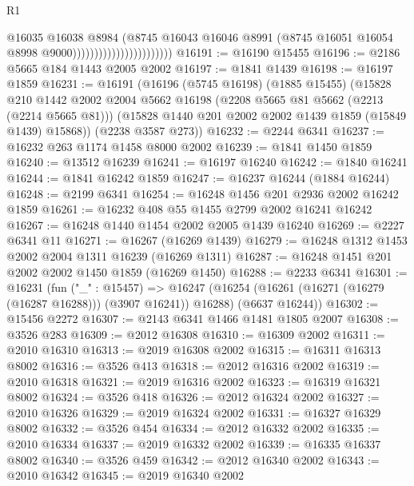 \begin{lexlean}{R1}
\begin{coremodule}
                                              @16035
                                              @16038
                                              @8984
                                              (@8745
                                                @16043
                                                @16046
                                                @8991
                                                (@8745
                                                  @16051
                                                  @16054
                                                  @8998
                                                  @9000)))))))))))))))))))))))
@16191 := @16190 @15455
@16196 := @2186 @5665 @184 @1443 @2005 @2002
@16197 := @1841 @1439
@16198 := @16197 @1859
@16231 := @16191
    (@16196
      (@5745 @16198)
      (@1885 @15455)
      (@15828
        @210
        @1442
        @2002
        @2004
        @5662
        @16198
        (@2208 @5665 @81 @5662 (@2213 (@2214 @5665 @81)))
        (@15828 @1440 @201 @2002 @2002 @1439 @1859 (@15849 @1439) @15868))
      (@2238 @3587 @273))
@16232 := @2244 @6341
@16237 := @16232 @263 @1174 @1458 @8000 @2002
@16239 := @1841 @1450 @1859
@16240 := @13512 @16239
@16241 := @16197 @16240
@16242 := @1840 @16241
@16244 := @1841 @16242 @1859
@16247 := @16237 @16244 (@1884 @16244)
@16248 := @2199 @6341
@16254 := @16248 @1456 @201 @2936 @2002 @16242 @1859
@16261 := @16232 @408 @55 @1455 @2799 @2002 @16241 @16242
@16267 := @16248 @1440 @1454 @2002 @2005 @1439 @16240
@16269 := @2227 @6341 @11
@16271 := @16267 (@16269 @1439)
@16279 := @16248 @1312 @1453 @2002 @2004 @1311 @16239 (@16269 @1311)
@16287 := @16248 @1451 @201 @2002 @2002 @1450 @1859 (@16269 @1450)
@16288 := @2233 @6341
@16301 := @16231
    (fun ("_" : @15457) =>
    @16247 (@16254 (@16261 (@16271 (@16279 (@16287 @16288))) (@3907 @16241)) @16288) (@6637 @16244))
@16302 := @15456 @2272
@16307 := @2143 @6341 @1466 @1481 @1805 @2007
@16308 := @3526 @283
@16309 := @2012 @16308
@16310 := @16309 @2002
@16311 := @2010 @16310
@16313 := @2019 @16308 @2002
@16315 := @16311 @16313 @8002
@16316 := @3526 @413
@16318 := @2012 @16316 @2002
@16319 := @2010 @16318
@16321 := @2019 @16316 @2002
@16323 := @16319 @16321 @8002
@16324 := @3526 @418
@16326 := @2012 @16324 @2002
@16327 := @2010 @16326
@16329 := @2019 @16324 @2002
@16331 := @16327 @16329 @8002
@16332 := @3526 @454
@16334 := @2012 @16332 @2002
@16335 := @2010 @16334
@16337 := @2019 @16332 @2002
@16339 := @16335 @16337 @8002
@16340 := @3526 @459
@16342 := @2012 @16340 @2002
@16343 := @2010 @16342
@16345 := @2019 @16340 @2002

\end{coremodule}
\end{lexlean}
